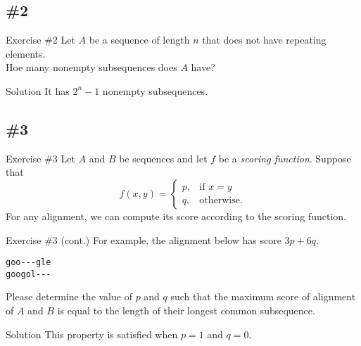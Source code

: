 \documentclass{beamer}
\begin{document}
\subsection{\#2}
\begin{frame}{Exercise \#2}
  Let $A$ be a sequence of length $n$ that does not have repeating elements. \\
  Hoe many nonempty subsequences does $A$ have? \pause
  \begin{block}{Solution}
    It has $2^n - 1$ nonempty subsequences.
  \end{block}
\end{frame}

\subsection{\#3}
\begin{frame}{Exercise \#3}
  Let $A$ and $B$ be sequences and let $f$ be a \emph{scoring function}.
  Suppose that
  \begin{equation*}
    f(x, y) =
    \begin{cases}
      p, & \text{if $x = y$} \\
      q, & \text{otherwise}.
    \end{cases}
  \end{equation*}
  \pause
  For any alignment, we can compute its score according to the scoring
  function.
\end{frame}

\begin{frame}{Exercise \#3 (cont.)}
  For example, the alignment below has score $3p + 6q$.
  \begin{center}
    \lstinline{goo---gle} \\
    \lstinline{googol---}
  \end{center}
  \pause
  Please determine the value of $p$ and $q$ such that the maximum score of
  alignment of $A$ and $B$ is equal to the length of their longest common
  subsequence. \pause
  \begin{block}{Solution}
    This property is satisfied when $p = 1$ and $q = 0$.
  \end{block}
\end{frame}
\end{document}
